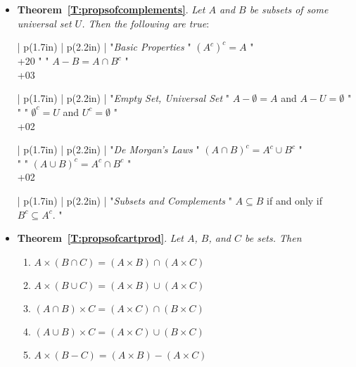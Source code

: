 \begin{itemize}
\item \textbf{Theorem~\ref{T:propsofcomplements}}.
\emph{Let  $A$  and  $B$  be subsets of some universal set  $U$.  Then the following are true}:

\noindent
\BeginTable
\BeginFormat
| p(1.7in) |  p(2.2in) |
\EndFormat
"\emph{Basic Properties}    "  $\left( A^c \right)^c = A$ " \\+20
"                    "  $A - B = A \cap B^c$   " \\+03
\EndTable

\noindent
\BeginTable
\BeginFormat
| p(1.7in) |  p(2.2in) |
\EndFormat
"\emph{Empty Set, Universal Set}      "  $A - \emptyset = A$ and $A - U = \emptyset$ " \\
"                    "  ${\emptyset}^c = U$ and $U^c = \emptyset$ " \\+02
\EndTable

\noindent
\BeginTable
\BeginFormat
| p(1.7in) |  p(2.2in) |
\EndFormat
"\emph{De Morgan's Laws}
%
    "  $\left ({A \cap B} \right)^c = A^c \cup B^c$ " \\
"                    "  $\left ({A \cup B} \right)^c = A^c \cap B^c$ " \\+02
\EndTable

\noindent
\BeginTable
\BeginFormat
| p(1.7in) |  p(2.2in) |
\EndFormat
"\emph{Subsets and Complements}        "  $A \subseteq B$ if and only if $B^c \subseteq A^c$. " \\
\EndTable
\item \textbf{Theorem~\ref{T:propsofcartprod}}.
\emph{Let  $A$, $B$, and  $C$  be sets.  Then}
\begin{enumerate}
\item $A \times \left( {B \cap C} \right) = \left( {A \times B} \right) \cap \left( {A \times C} \right)$
 
\item $A \times \left( {B \cup C} \right) = \left( {A \times B} \right) \cup \left( {A \times C} \right)$

\item $\left( {A \cap B} \right) \times C = \left( {A \times C} \right) \cap \left( {B \times C} \right)$ 

\item $\left( {A \cup B} \right) \times C = \left( {A \times C} \right) \cup \left( {B \times C} \right)$ 

\item $A \times \left( {B - C} \right) = \left( {A \times B} \right) - \left( {A \times C} \right)$ 


\end{enumerate}
\end{itemize}
